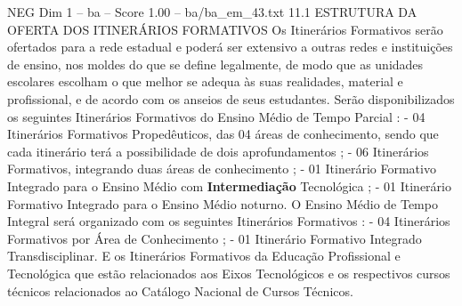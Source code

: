 \begin{textsample}{NEG Dim 1 – ba – Score 1.00 – ba/ba\_em\_43.txt}  \label{ex:f1_neg_181}
11.1 ESTRUTURA DA OFERTA DOS ITINERÁRIOS FORMATIVOS Os Itinerários Formativos serão ofertados para a rede estadual e poderá ser extensivo a outras redes e instituições de ensino, nos moldes do que se define legalmente, de modo que as unidades escolares escolham o que melhor se adequa às suas realidades, material e profissional, e de acordo com os anseios de seus estudantes.
Serão disponibilizados os seguintes Itinerários Formativos do Ensino Médio de Tempo Parcial : - 04 Itinerários Formativos Propedêuticos, das 04 áreas de conhecimento, sendo que cada itinerário terá a possibilidade de dois aprofundamentos ; - 06 Itinerários Formativos, integrando duas áreas de conhecimento ; - 01 Itinerário Formativo Integrado para o Ensino Médio com \textbf{Intermediação} Tecnológica ; - 01 Itinerário Formativo Integrado para o Ensino Médio noturno.
O Ensino Médio de Tempo Integral será organizado com os seguintes Itinerários Formativos : - 04 Itinerários Formativos por Área de Conhecimento ; - 01 Itinerário Formativo Integrado Transdisciplinar.
E os Itinerários Formativos da Educação Profissional e Tecnológica que estão relacionados aos Eixos Tecnológicos e os respectivos cursos técnicos relacionados ao Catálogo Nacional de Cursos Técnicos.

\end{textsample}
